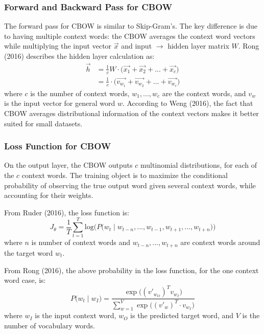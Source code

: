 \subsubsection{Forward and Backward Pass for CBOW}

The forward pass for CBOW is similar to Skip-Gram's. The key difference is due to having multiple context words: the CBOW averages the context word vectors while multiplying the input vector $\overrightarrow{x}$ and input $\rightarrow$ hidden layer matrix $W$. Rong (2016) describes the hidden layer calculation as: 
$$
\begin{array}{ll}
\overrightarrow{h} 
&= \frac{1}{c} W \cdot \Big(\overrightarrow{x_1} + \overrightarrow{x_2} + ... + \overrightarrow{x_c} \Big) \\
&= \frac{1}{c} \cdot \Big(\overrightarrow{v_{w_1}} + \overrightarrow{v_{w_2}} + ... + \overrightarrow{v_{w_c}} \Big)
\end{array}
$$
where $c$ is the number of context words, $w_1,...,w_c$ are the context words, and $v_w$ is the input vector for general word $w$. According to Weng (2016), the fact that CBOW averages distributional information of the context vectors makes it better suited for small datasets. 

\subsubsection{Loss Function for CBOW}

On the output layer, the CBOW outputs $c$ multinomial distributions, for each of the $c$ context words. The training object is to maximize the conditional probability of observing the true output word given several context words, while accounting for their weights. 

From Ruder (2016), the loss function is: 
$$
J_\theta = \frac{1}{T} \sum_{t=1}^T \text{log} \Big( P \Big( w_t \; | \; w_{t-n}, ..., w_{t-1}, w_{t+1}, ..., w_{t+n} \Big) \Big)
$$
where $n$ is number of context words and $w_{t-n}, ..., w_{t+n}$ are context words around the target word $w_t$. 

From Rong (2016), the above probability in the loss function, for the one context word case, is:
$$
P \Big( w_t \; | \; w_I \Big) = \frac {\exp{ \Big( (v'_{w_O})^T  v_{w_I} \Big) }} {\sum_{w=1}^V \exp{ \Big( (v'_w)^T \cdot v_{w_I} \Big) }}
$$
where $w_I$ is the input context word, $w_O$ is the predicted target word, and $V$ is the number of vocabulary words. 
  


